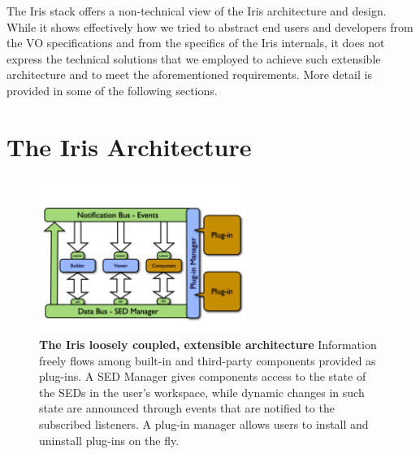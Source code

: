 \documentclass[final,5p,authoryear]{elsarticle}
\begin{document}
The Iris stack offers a non-technical view of the Iris architecture and design.
While it shows effectively how we tried to abstract end users and developers
from the VO specifications and from the specifics of the Iris internals, it does
not express the technical solutions that we employed to achieve such extensible
architecture and to meet the aforementioned requirements. More detail is
provided in some of the following sections.



\section{The Iris Architecture} \label{sec:architecture}

\begin{figure} \begin{center}
\includegraphics[width=0.6\textwidth]{figures/IrisDiagrams.001.png}
\caption{\textbf{The Iris loosely coupled, extensible architecture} Information
freely flows among built-in and third-party components provided as plug-ins. A
SED Manager gives components access to the state of the SEDs in the user's
workspace, while dynamic changes in such state are announced through events that
are notified to the subscribed listeners. A plug-in manager allows users to
install and uninstall plug-ins on the fly.} \label{fig:architecture}
\end{center} \end{figure}
\end{document}
